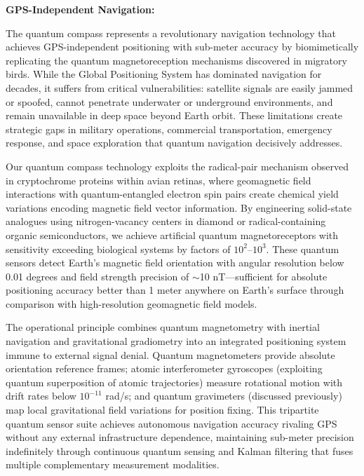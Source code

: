 \documentclass[11pt,a4paper,twoside]{article}
\begin{document}
\textbf{GPS-Independent Navigation:}

The quantum compass represents a revolutionary navigation technology that achieves GPS-independent positioning with sub-meter accuracy by biomimetically replicating the quantum magnetoreception mechanisms discovered in migratory birds. While the Global Positioning System has dominated navigation for decades, it suffers from critical vulnerabilities: satellite signals are easily jammed or spoofed, cannot penetrate underwater or underground environments, and remain unavailable in deep space beyond Earth orbit. These limitations create strategic gaps in military operations, commercial transportation, emergency response, and space exploration that quantum navigation decisively addresses.

Our quantum compass technology exploits the radical-pair mechanism observed in cryptochrome proteins within avian retinas, where geomagnetic field interactions with quantum-entangled electron spin pairs create chemical yield variations encoding magnetic field vector information. By engineering solid-state analogues using nitrogen-vacancy centers in diamond or radical-containing organic semiconductors, we achieve artificial quantum magnetoreceptors with sensitivity exceeding biological systems by factors of $10^2$--$10^3$. These quantum sensors detect Earth's magnetic field orientation with angular resolution below 0.01 degrees and field strength precision of $\sim$10 nT---sufficient for absolute positioning accuracy better than 1 meter anywhere on Earth's surface through comparison with high-resolution geomagnetic field models.

The operational principle combines quantum magnetometry with inertial navigation and gravitational gradiometry into an integrated positioning system immune to external signal denial. Quantum magnetometers provide absolute orientation reference frames; atomic interferometer gyroscopes (exploiting quantum superposition of atomic trajectories) measure rotational motion with drift rates below $10^{-11}$ rad/s; and quantum gravimeters (discussed previously) map local gravitational field variations for position fixing. This tripartite quantum sensor suite achieves autonomous navigation accuracy rivaling GPS without any external infrastructure dependence, maintaining sub-meter precision indefinitely through continuous quantum sensing and Kalman filtering that fuses multiple complementary measurement modalities.
\end{document}
